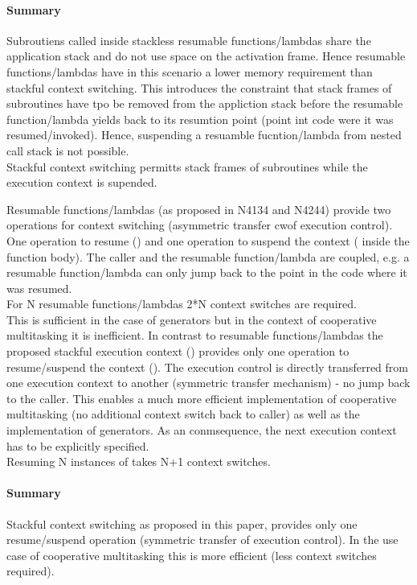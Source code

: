 \paragraph*{Summary}
Subroutiens called inside stackless resumable functions/lambdas share the
application stack and do not use space on the activation frame. Hence resumable
functions/lambdas have in this scenario a lower memory requirement than stackful
context switching. This introduces the constraint that stack frames of
subroutines have tpo be removed from the appliction stack before the resumable
function/lambda yields back to its resumtion point (point int code were it was
resumed/invoked). Hence, suspending a resuamble fucntion/lambda from nested call
stack is not possible.\\
Stackful context switching permitts stack frames of subroutines while the
execution context is supended.

Resumable functions/lambdas (as proposed in N4134 and N4244) provide two
operations for context switching (asymmetric transfer cwof execution control).
One operation to resume (\rlop) and one operation to suspend the context (\yield
inside the function body). The caller and the resumable function/lambda are
coupled, e.g. a resumable function/lambda can only jump back to the point in the
code where it was resumed.\\
\newline
For N resumable functions/lambdas 2*N context switches are required.\\
This is sufficient in the case of generators but in the context of cooperative
multitasking it is inefficient.
In contrast to resumable functions/lambdas the proposed stackful execution
context (\ectx) provides only one operation to resume/suspend the context
(\ectxop). The execution control is directly transferred from one
execution context to another (symmetric transfer mechanism) - no jump back to
the caller. This enables a much more efficient implementation of cooperative
multitasking (no additional context switch back to caller) as well as the
implementation of generators. As an conmsequence, the next execution context has
to be explicitly specified.\\
\newline
Resuming N instances of \ectx takes N+1 context switches.
\newline
\paragraph*{Summary}
Stackful context switching as proposed in this paper, provides only one
resume/suspend operation (symmetric transfer of execution control). In the use
case of cooperative multitasking this is more efficient (less context switches
required).

